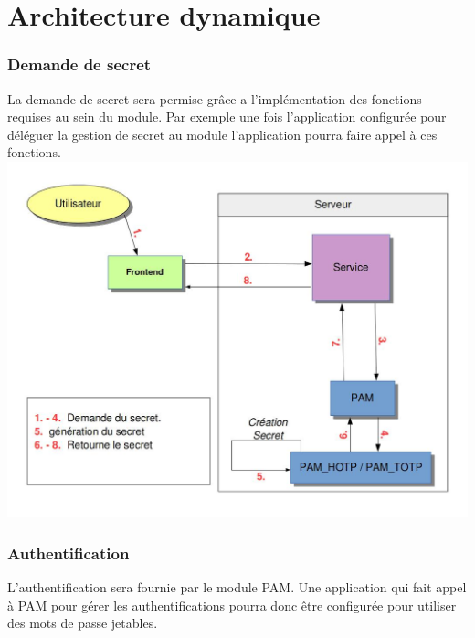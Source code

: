 \documentclass{"../../res/univ-projet"}
\begin{document}
\part*{Architecture dynamique}
\section{Demande de secret}
La demande de secret sera permise grâce a l'implémentation des fonctions requises au sein du
module. Par exemple une fois l'application configurée pour déléguer la gestion de secret au
module l'application pourra faire appel à ces fonctions.
\newline
\includegraphics[width=\textwidth]{../graphics/association.jpg}

\section{Authentification}
L'authentification sera fournie par le module PAM. Une application qui fait appel à PAM pour gérer
les authentifications pourra donc être configurée pour utiliser des mots de passe jetables.
\end{document}

